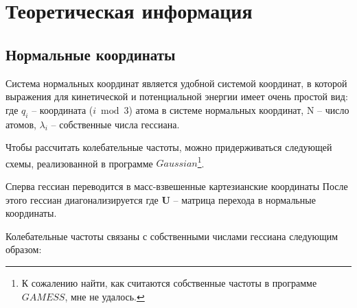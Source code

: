\section{Теоретическая информация}
\subsection{Нормальные координаты}
Система нормальных координат является удобной системой координат, в которой выражения для кинетической и потенциальной энергии имеет очень простой вид:
где $q_i$ -- координата ($i \bmod 3$) атома в системе нормальных координат, N -- число атомов, $\lambda_i$ -- собственные числа гессиана. 

Чтобы рассчитать колебательные частоты, можно придерживаться следующей схемы, реализованной в программе $Gaussian$\footnote{К сожалению найти, как считаются собственные частоты в программе $GAMESS$, мне не удалось.}.

Сперва гессиан переводится в масс-взвешенные картезианские координаты
После этого гессиан диагонализируется
где \textbf{U} -- матрица перехода в нормальные координаты.

Колебательные частоты связаны с собственными числами гессиана следующим образом:

